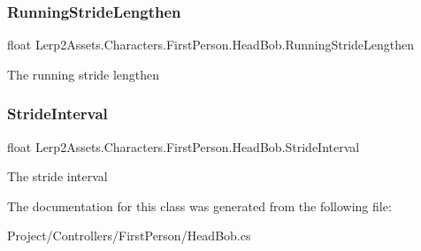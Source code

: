 \subsubsection{\texorpdfstring{Running\+Stride\+Lengthen}{RunningStrideLengthen}}
{\footnotesize\ttfamily float Lerp2\+Assets.\+Characters.\+First\+Person.\+Head\+Bob.\+Running\+Stride\+Lengthen}



The running stride lengthen 

\mbox{\label{class_lerp2_assets_1_1_characters_1_1_first_person_1_1_head_bob_a56b68c4aa608ba9b498436770c2aa552}} 
\subsubsection{\texorpdfstring{Stride\+Interval}{StrideInterval}}
{\footnotesize\ttfamily float Lerp2\+Assets.\+Characters.\+First\+Person.\+Head\+Bob.\+Stride\+Interval}



The stride interval 



The documentation for this class was generated from the following file\+:\begin{DoxyCompactItemize}
\item 
Project/\+Controllers/\+First\+Person/Head\+Bob.\+cs\end{DoxyCompactItemize}
